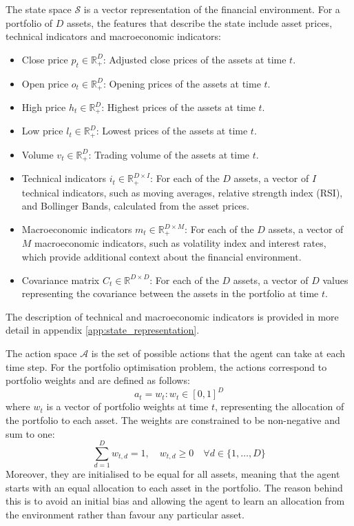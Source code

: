 The state space $\mathcal{S}$ is a vector representation of the financial environment. For a portfolio of $D$ assets, the features that describe the state include asset prices, technical indicators and macroeconomic indicators: 
\begin{itemize}
    \item Close price $p_t \in \mathbb{R}_+^D$: Adjusted close prices of the assets at time $t$.
    \item Open price $o_t \in \mathbb{R}_+^D$: Opening prices of the assets at time $t$.
    \item High price $h_t \in \mathbb{R}_+^D$: Highest prices of the assets at time $t$.
    \item Low price $l_t \in \mathbb{R}_+^D$: Lowest prices of the assets at time $t$.
    \item Volume $v_t \in \mathbb{R}_+^D$: Trading volume of the assets at time $t$.
    \item Technical indicators $i_t \in \mathbb{R}_+^{D \times I}$: For each of the $D$ assets, a vector of $I$ technical indicators, such as moving averages, relative strength index (RSI), and Bollinger Bands, calculated from the asset prices.
    \item Macroeconomic indicators $m_t \in \mathbb{R}_+^{D \times M}$: For each of the $D$ assets, a vector of $M$ macroeconomic indicators, such as volatility index and interest rates, which provide additional context about the financial environment.
    \item Covariance matrix $C_t \in \mathbb{R}^{D \times D}$: For each of the $D$ assets, a vector of $D$ values representing the covariance between the assets in the portfolio at time $t$.
\end{itemize}

The description of technical and macroeconomic indicators is provided in more detail in appendix \ref{app:state_representation}.

The action space $\mathcal{A}$ is the set of possible actions that the agent can take at each time step. For the portfolio optimisation problem, the actions correspond to portfolio weights and are defined as follows:
\begin{equation}
    a_t = w_t : w_t \in [0, 1]^D
\end{equation}
where $w_t$ is a vector of portfolio weights at time $t$, representing the allocation of the portfolio to each asset. The weights are constrained to be non-negative and sum to one:
\begin{equation}
    \sum_{d=1}^D w_{t,d} = 1, \quad w_{t,d} \geq 0 \quad \forall d \in \{1, \ldots, D\}
\end{equation}
Moreover, they are initialised to be equal for all assets, meaning that the agent starts with an equal allocation to each asset in the portfolio. The reason behind this is to avoid an initial bias and allowing the agent to learn an allocation from the environment rather than favour any particular asset.

